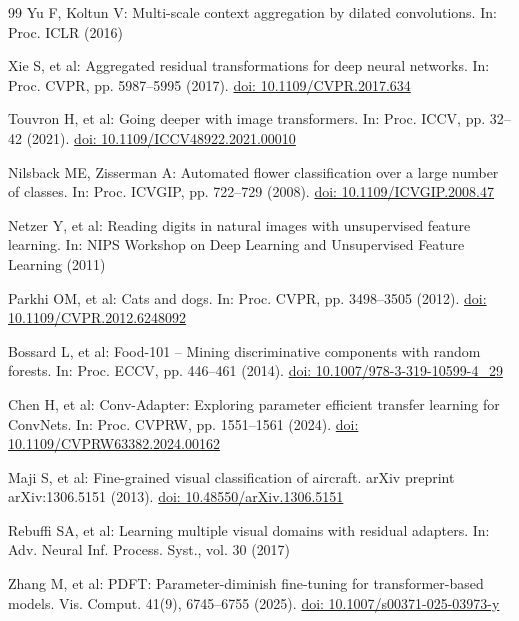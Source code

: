 \documentclass[pdflatex,sn-mathphys-num]{sn-jnl}
\theoremstyle{thmstyleone}
\theoremstyle{thmstyletwo}
\theoremstyle{thmstylethree}
\begin{document}
\begin{thebibliography}{99}
Yu F, Koltun V:
Multi-scale context aggregation by dilated convolutions.
In: Proc. ICLR (2016)

Xie S, et al:
Aggregated residual transformations for deep neural networks.
In: Proc. CVPR, pp. 5987--5995 (2017).
\href{https://doi.org/10.1109/CVPR.2017.634}{doi: 10.1109/CVPR.2017.634}

Touvron H, et al:
Going deeper with image transformers.
In: Proc. ICCV, pp. 32--42 (2021).
\href{https://doi.org/10.1109/ICCV48922.2021.00010}{doi: 10.1109/ICCV48922.2021.00010}

Nilsback ME, Zisserman A:
Automated flower classification over a large number of classes.
In: Proc. ICVGIP, pp. 722--729 (2008).
\href{https://doi.org/10.1109/ICVGIP.2008.47}{doi: 10.1109/ICVGIP.2008.47}

Netzer Y, et al:
Reading digits in natural images with unsupervised feature learning.
In: NIPS Workshop on Deep Learning and Unsupervised Feature Learning (2011)

Parkhi OM, et al:
Cats and dogs.
In: Proc. CVPR, pp. 3498--3505 (2012).
\href{https://doi.org/10.1109/CVPR.2012.6248092}{doi: 10.1109/CVPR.2012.6248092}

Bossard L, et al:
Food-101 -- Mining discriminative components with random forests.
In: Proc. ECCV, pp. 446--461 (2014).
\href{https://doi.org/10.1007/978-3-319-10599-4_29}{doi: 10.1007/978-3-319-10599-4\_29}

Chen H, et al:
Conv-Adapter: Exploring parameter efficient transfer learning for ConvNets.
In: Proc. CVPRW, pp. 1551--1561 (2024).
\href{https://doi.org/10.1109/CVPRW63382.2024.00162}{doi: 10.1109/CVPRW63382.2024.00162}

Maji S, et al:
Fine-grained visual classification of aircraft.
arXiv preprint arXiv:1306.5151 (2013).
\href{https://doi.org/10.48550/arXiv.1306.5151}{doi: 10.48550/arXiv.1306.5151}


Rebuffi SA, et al:
Learning multiple visual domains with residual adapters.
In: Adv. Neural Inf. Process. Syst., vol. 30 (2017)

Zhang M, et al:
PDFT: Parameter-diminish fine-tuning for transformer-based models.
Vis. Comput. 41(9), 6745--6755 (2025).
\href{https://doi.org/10.1007/s00371-025-03973-y}{doi: 10.1007/s00371-025-03973-y}


\end{thebibliography}
\end{document}
